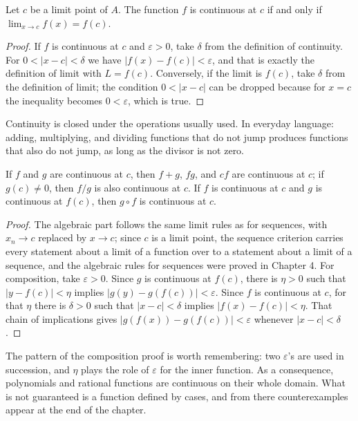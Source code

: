 \begin{proposisi}
Let $c$ be a limit point of $A$. The function $f$ is continuous at $c$ if and only if
$\lim_{x\to c}f(x)=f(c)$.
\end{proposisi}

\begin{proof}
If $f$ is continuous at $c$ and $\varepsilon>0$, take $\delta$ from the definition of
continuity. For $0<|x-c|<\delta$ we have $|f(x)-f(c)|<\varepsilon$, and that is exactly
the definition of limit with $L=f(c)$. Conversely, if the limit is $f(c)$, take $\delta$
from the definition of limit; the condition $0<|x-c|$ can be dropped because for $x=c$
the inequality becomes $0<\varepsilon$, which is true.
\end{proof}

Continuity is closed under the operations usually used. In everyday language: adding,
multiplying, and dividing functions that do not jump produces functions that also do not
jump, as long as the divisor is not zero.

\begin{proposisi}
If $f$ and $g$ are continuous at $c$, then $f+g$, $fg$, and $cf$ are continuous at $c$;
if $g(c)\neq 0$, then $f/g$ is also continuous at $c$. If $f$ is continuous at $c$ and
$g$ is continuous at $f(c)$, then $g\circ f$ is continuous at $c$.
\end{proposisi}

\begin{proof}
The algebraic part follows the same limit rules as for sequences, with
$x_{n}\to c$ replaced by $x\to c$; since $c$ is a limit point, the sequence criterion
carries every statement about a limit of a function over to a statement about a limit of
a sequence, and the algebraic rules for sequences were proved in Chapter 4. For
composition, take $\varepsilon>0$. Since $g$ is continuous at $f(c)$, there is
$\eta>0$ such that $|y-f(c)|<\eta$ implies $|g(y)-g(f(c))|<\varepsilon$. Since $f$ is
continuous at $c$, for that $\eta$ there is $\delta>0$ such that $|x-c|<\delta$ implies
$|f(x)-f(c)|<\eta$. That chain of implications gives $|g(f(x))-g(f(c))|<\varepsilon$
whenever $|x-c|<\delta$.
\end{proof}

The pattern of the composition proof is worth remembering: two $\varepsilon$'s are used
in succession, and $\eta$ plays the role of $\varepsilon$ for the inner function. As a
consequence, polynomials and rational functions are continuous on their whole domain.
What is not guaranteed is a function defined by cases, and from there counterexamples
appear at the end of the chapter.

